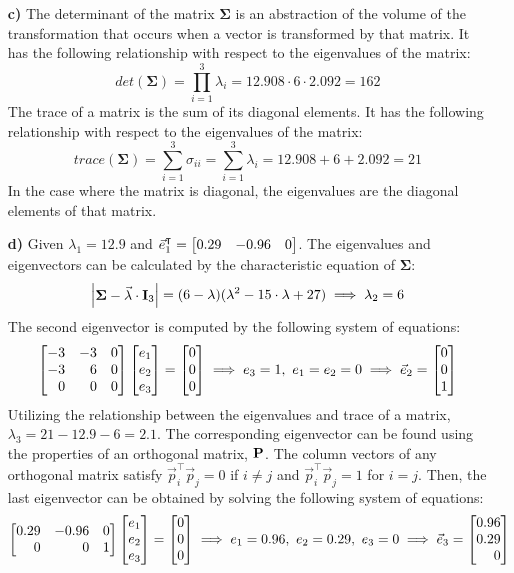 \begin{enumerate}
\item[\bf{c)}]
	The determinant of the matrix $\mathbf{\Sigma}$ is an abstraction of the volume of the transformation that occurs when a vector is transformed by that matrix. It has the following relationship with respect to the eigenvalues of the matrix: $$det(\mathbf{\Sigma}) =\prod_{i=1}^3\lambda_i=12.908\cdot6\cdot2.092=162$$ The trace of a matrix is the sum of its diagonal elements. It has the following relationship with respect to the eigenvalues of the matrix: $$trace(\mathbf{\Sigma})=\sum_{i=1}^3\sigma_{ii}=\sum_{i=1}^3\lambda_i = 12.908 + 6 + 2.092 = 21$$ In the case where the matrix is diagonal, the eigenvalues are the diagonal elements of that matrix.

\item[\bf{d)}]
	Given $\lambda_1 =12.9$ and $\vec{e}_1^{\intercal} = \m{0.29&-0.96&0}$. The eigenvalues and eigenvectors can be calculated by the characteristic equation of $\mathbf{\Sigma}$: $$\md{\mathbf{\Sigma} - \vec{\lambda}\cdot\mathbf{I}_3} = (6 - \lambda)(\lambda^2 - 15\cdot\lambda + 27) \implies \lambda_2 = 6$$ The second eigenvector is computed by the following system of equations: $$\m{-3&-3&0\\-3&6&0\\0&0&0} \m{e_1\\e_2\\e_3} = \m{0\\0\\0} \implies e_3 = 1,\ e_1 = e_2 = 0 \implies \vec{e}_2=\m{0\\0\\1}$$ Utilizing the relationship between the eigenvalues and trace of a matrix, $\lambda_3 = 21 - 12.9 - 6 = 2.1$. The corresponding eigenvector can be found using the properties of an orthogonal matrix, $\mathrm{\bf{P}}$. The column vectors of any orthogonal matrix satisfy $\vec{p}_i^{\intercal}\vec{p}_j = 0$ if $i \neq j$ and $\vec{p}_i^{\intercal}\vec{p}_j = 1$ for $i = j$. Then, the last eigenvector can be obtained by solving the following system of equations: $$\m{0.29&-0.96&0\\0&0&1} \m{e_1\\e_2\\e_3} = \m{0\\0\\0} \implies e_1 = 0.96,\ e_2 = 0.29,\ e_3 = 0 \implies \vec{e}_3=\m{0.96\\0.29\\0}$$ 


\end{enumerate}
